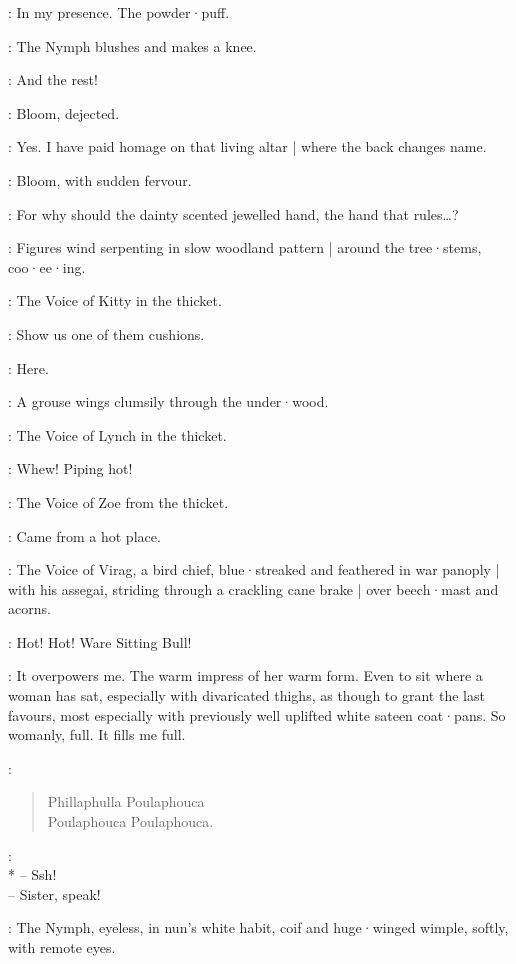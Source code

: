 \Nymph:
In my presence.
The powder·puff.

:
The Nymph blushes and makes a knee.

\Nymph:
And the rest!

:
Bloom,
dejected.

\Bloom:
Yes.
I have paid homage on that living altar |
where the back changes name.

:
Bloom,
with sudden fervour.

\Bloom:
For why should the dainty scented jewelled hand,
the hand that rules…?

:
Figures wind serpenting in slow woodland pattern |
around the tree·stems,
coo·ee·ing.

:
The Voice of Kitty in the thicket.

\VoiceKitty:
Show us one of them cushions.

\VoiceFlorry[1]:
Here.

:
A grouse wings clumsily through the under·wood.

:
The Voice of Lynch in the thicket.

\VoiceLynch:
Whew!
Piping hot!

:
The Voice of Zoe from the thicket.

\VoiceZoe:
Came from a hot place.

:
The Voice of Virag,
%
a bird chief,
blue·streaked and feathered in war panoply |
with his assegai,
striding through a crackling cane brake |
over beech·mast and acorns.

\VoiceVirag:
Hot! Hot!
Ware Sitting Bull!

\Bloom:
It overpowers me.
The warm impress of her warm form.
Even to sit where a woman has sat,
especially with divaricated thighs,
as though to grant the last favours,
most especially with previously well uplifted white sateen coat·pans.
So womanly,
full.
It fills me full.

\Waterfall[2]:
\begin{verse}
    Phillaphulla Poulaphouca\\
%
    Poulaphouca Poulaphouca.
\end{verse}

\Yews[2]:\\*
-- Ssh!\\
-- Sister, speak!

:
The Nymph,
eyeless,
in nun's white habit,
coif and huge·winged wimple,
softly,
with remote eyes.

